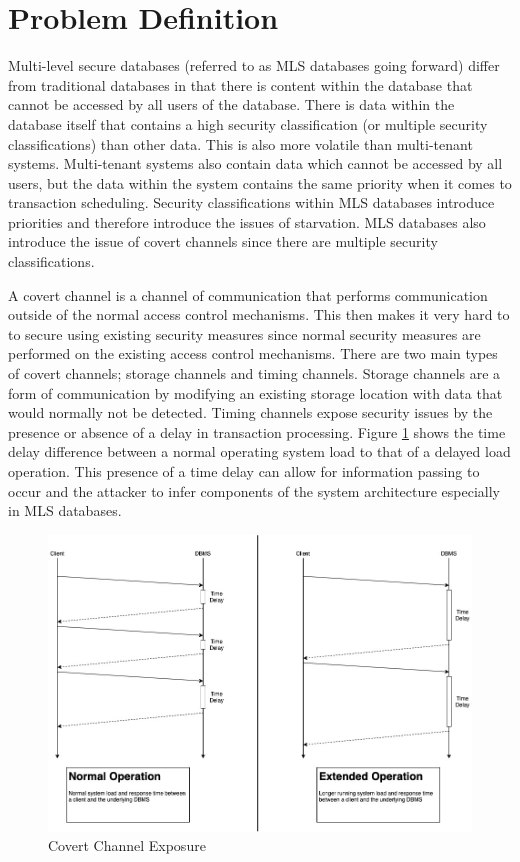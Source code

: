 \section{Problem Definition}
\label{mls:problem_definition}

Multi-level secure databases (referred to as \ac{MLS} databases going forward) differ from traditional databases in that there is content within the database that cannot be accessed by all users of the database. There is data within the database itself that contains a high security classification (or multiple security classifications) than other data. This is also more volatile than multi-tenant systems. Multi-tenant systems also contain data which cannot be accessed by all users, but the data within the system contains the same priority when it comes to transaction scheduling. Security classifications within \ac{MLS} databases introduce priorities and therefore introduce the issues of starvation. \ac{MLS} databases also introduce the issue of covert channels since there are multiple security classifications. 

A covert channel is a channel of communication that performs communication outside of the normal access control mechanisms. This then makes it very hard to to secure using existing security measures since normal security measures are performed on the existing access control mechanisms. There are two main types of covert channels; storage channels and timing channels. Storage channels are a form of communication by modifying an existing storage location with data that would normally not be detected. Timing channels expose security issues by the presence or absence of a delay in transaction processing. Figure \ref{fig:covert_channel_exposure} shows the time delay difference between a normal operating system load to that of a delayed load operation. This presence of a time delay can allow for information passing to occur and the attacker to infer components of the system architecture especially in \ac{MLS} databases.

\begin{figure}
\centering
\includegraphics[scale=0.45]{images/CovertTimingChannel.jpg}
\caption{Covert Channel Exposure}
\label{fig:covert_channel_exposure}
\end{figure}


